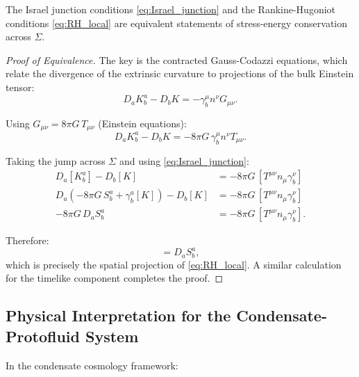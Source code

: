 \begin{proposition}
\label{prop:equivalence}
The Israel junction conditions \eqref{eq:Israel_junction} and the Rankine-Hugoniot conditions \eqref{eq:RH_local} are equivalent statements of stress-energy conservation across $\Sigma$.
\end{proposition}

\begin{proof}[Proof of Equivalence]
The key is the contracted Gauss-Codazzi equations, which relate the divergence of the extrinsic curvature to projections of the bulk Einstein tensor:
\begin{equation}
\label{eq:Gauss_Codazzi}
D_a K^a_b - D_b K = -\gamma^\mu_b n^\nu G_{\mu\nu}.
\end{equation}

Using $G_{\mu\nu} = 8\pi G \, T_{\mu\nu}$ (Einstein equations):
\begin{equation}
D_a K^a_b - D_b K = -8\pi G \, \gamma^\mu_b n^\nu T_{\mu\nu}.
\end{equation}

Taking the jump across $\Sigma$ and using \eqref{eq:Israel_junction}:
\begin{align}
D_a [K^a_b] - D_b [K] &= -8\pi G \, [T^{\mu\nu} n_\mu \gamma^\nu_b] \\
D_a \left( -8\pi G \, S^a_b + \gamma^a_b [K] \right) - D_b [K] &= -8\pi G \, [T^{\mu\nu} n_\mu \gamma^\nu_b] \\
-8\pi G \, D_a S^a_b &= -8\pi G \, [T^{\mu\nu} n_\mu \gamma^\nu_b].
\end{align}

Therefore:
\begin{equation}
[T^{\mu\nu} n_\mu \gamma^\nu_b] = D_a S^a_b,
\end{equation}
which is precisely the spatial projection of \eqref{eq:RH_local}. A similar calculation for the timelike component completes the proof.
\end{proof}

\subsection{Physical Interpretation for the Condensate-Protofluid System}
\label{app:RH_physical}

In the condensate cosmology framework:

